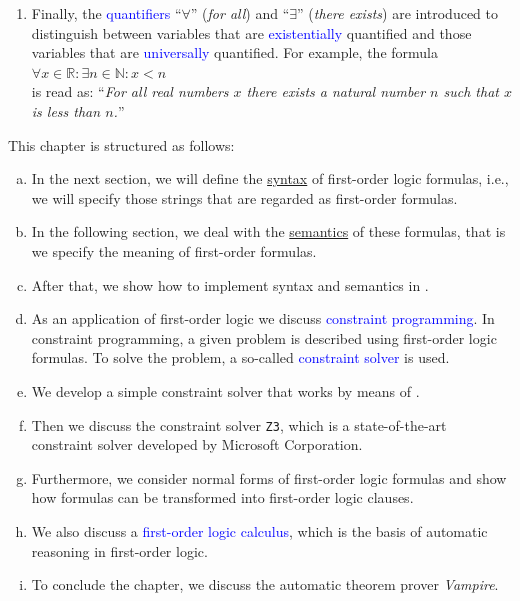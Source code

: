 \begin{enumerate}
      $x > 1 \rightarrow x + 7 < x \cdot  7$.
\item Finally, the \textcolor{blue}{quantifiers} ``$\forall$'' (\emph{for all}) and
      ``$\exists$'' (\emph{there exists}) are introduced to distinguish between variables that are
      \textcolor{blue}{existentially} quantified and those variables that are \textcolor{blue}{universally}
      quantified.  For example, the formula 
      \\[0.2cm]
      \hspace*{1.3cm}
      $\forall x \in \mathbb{R}: \exists n \in \mathbb{N}: x < n$
      \\[0.2cm]
      is read as: ``\textsl{For all real numbers $x$ there exists a natural number $n$ such that $x$ is less
        than $n$.}''
\end{enumerate}
This chapter is structured as follows:
\begin{enumerate}[(a)]
\item In the next section, we will define the \href{https://en.wikipedia.org/wiki/Syntax}{syntax} of
      first-order logic formulas, i.e., we will specify those strings that are regarded as first-order
      formulas.
\item In the following section, we deal with the
      \href{https://en.wikipedia.org/wiki/Semantics}{semantics} of these formulas, that is we specify the 
      meaning of first-order formulas.
\item After that, we show how to implement syntax and semantics in \Fsharp.
\item As an application of first-order logic we discuss \textcolor{blue}{constraint programming}.
      In constraint programming, a given problem is described using first-order logic formulas.
      To solve the problem, a so-called \textcolor{blue}{constraint solver} is used.
\item We develop a simple constraint solver that works by means of .
\item Then we discuss the constraint solver \texttt{Z3}, which is a state-of-the-art constraint solver
      developed by Microsoft Corporation.
\item Furthermore, we consider normal forms of first-order logic formulas and show how formulas
      can be transformed into first-order logic clauses.
\item We also discuss a \textcolor{blue}{first-order logic calculus}, which is the basis
      of automatic reasoning in first-order logic.
\item To conclude the chapter, we discuss the automatic theorem prover \textsl{Vampire}.
\end{enumerate}

